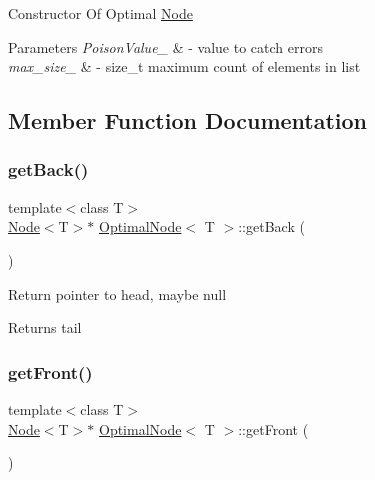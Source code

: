 Constructor Of Optimal \hyperlink{classList}{Node}
\begin{DoxyParams}{Parameters}
{\em Poison\+Value\+\_\+} & -\/ value to catch errors \\
\hline
{\em max\+\_\+size\+\_\+} & -\/ size\+\_\+t maximum count of elements in list \\
\hline
\end{DoxyParams}


\subsection{Member Function Documentation}
\mbox{\label{classOptimalList_ada40c2476927e5518a52874bc8dda530}} 
\subsubsection{\texorpdfstring{get\+Back()}{getBack()}}
{\footnotesize\ttfamily template$<$class T$>$ \\
\hyperlink{classList}{Node}$<$T$>$$\ast$ \hyperlink{classOptimalList}{Optimal\+Node}$<$ T $>$\+::get\+Back (\begin{DoxyParamCaption}{ }\end{DoxyParamCaption})\hspace{0.3cm}{\ttfamily [inline]}}

Return pointer to head, maybe null \begin{DoxyReturn}{Returns}
tail 
\end{DoxyReturn}
\mbox{\label{classOptimalList_a00d74f7c423b28382c4ce7d0e962b30d}} 
\subsubsection{\texorpdfstring{get\+Front()}{getFront()}}
{\footnotesize\ttfamily template$<$class T$>$ \\
\hyperlink{classList}{Node}$<$T$>$$\ast$ \hyperlink{classOptimalList}{Optimal\+Node}$<$ T $>$\+::get\+Front (\begin{DoxyParamCaption}{ }\end{DoxyParamCaption})\hspace{0.3cm}{\ttfamily [inline]}}


